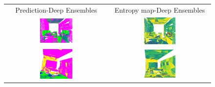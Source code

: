     \begin{figure}[h!]
        \centering
        \begin{tabular}{cc}
            Prediction-Deep Ensembles & Entropy map-Deep Ensembles \\
            \includegraphics[width=0.33\textwidth, height=0.18\textheight]{images/seg_output/s3dis_DE/S3DIS_1_Pred.png}& 
            \includegraphics[width=0.33\textwidth, height=0.18\textheight]{images/seg_output/flipout/ent_de_s3dis_3.png}\\

            \includegraphics[width=0.33\textwidth, height=0.18\textheight]{images/seg_output/s3dis_DE/S3DIS_2_Pred.png}& 
            \includegraphics[width=0.33\textwidth, height=0.18\textheight]{images/seg_output/flipout/ent_de_s3dis_1.png}\\


\end{tabular}
\end{figure}
